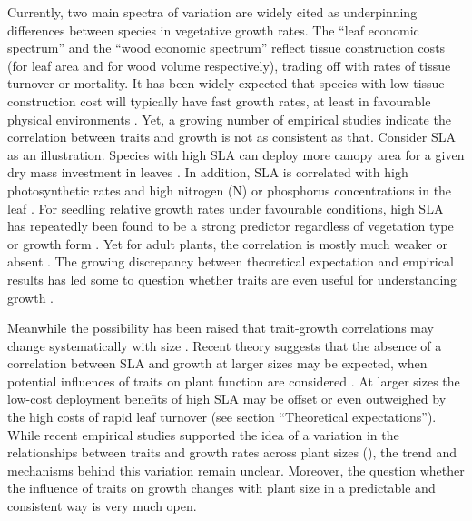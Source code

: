 \documentclass[a4paper]{article}\usepackage[]{graphicx}\usepackage[]{color}
\begin{document}
Currently, two main spectra of variation are widely cited as underpinning differences between species in vegetative growth rates. The ``leaf economic spectrum'' \citep{Wright:2004jb} and the ``wood economic spectrum'' \citep{Chave:2009iy} reflect tissue construction costs (for leaf area and for wood volume respectively), trading off with rates of tissue turnover or mortality. It has been widely expected that species with low tissue construction cost will typically have fast growth rates, at least in favourable physical environments \citep[e.g.][]{MullerLandau:2004dc,Wright:2004jb,Poorter:2008iu,Chave:2009iy,Larjavaara:2010bn,Iida:2012jb,Paine:2015df}. Yet, a growing number of empirical studies indicate the correlation between traits and growth is not as consistent as that. Consider SLA as an illustration. Species with high SLA can deploy more canopy area for a given dry mass investment in leaves \citep{Poorter:1999wd, Reich:1992wm}. In addition, SLA is correlated with high photosynthetic rates and high nitrogen (N) or phosphorus concentrations in the leaf \citep{Wright:2004jb}. For seedling relative growth rates under favourable conditions, high SLA has repeatedly been found to be a strong predictor regardless of vegetation type or growth form \citep{Lambers:1992bj,Reich:1992wm,Grime:1997wm,Poorter:1999wd,Wright:1999ds}. Yet for adult plants, the correlation is mostly much weaker or absent \citep{coomes_comparison_1998,Poorter:2008iu,Aiba:2009ft,Easdale:2009gv,Wright:2010tp}. The growing discrepancy between theoretical expectation and empirical results has led some to question whether traits are even useful for understanding growth \citep{Wright:2010tp, Paine:2015df}.

Meanwhile the possibility has been raised that trait-growth correlations may change systematically with size \citep{Falster:2011ii, Ruger:2012jv, Iida:2014ep, Iida:2014hq}. Recent theory suggests that the absence of a correlation between SLA and growth at larger sizes may be expected, when potential influences of traits on plant function are considered \citep{Falster:2011ii}. At larger sizes the low-cost deployment benefits of high SLA may be offset or even outweighed by the high costs of rapid leaf turnover (see section ``Theoretical expectations''). While recent empirical studies supported the idea of a variation in the relationships between traits and growth rates across plant sizes (\citealt{Iida:2014ep, Iida:2014hq}), the trend and mechanisms behind this variation remain unclear. Moreover, the question whether the influence of traits on growth changes with plant size in a predictable and consistent way is very much open.
\end{document}
